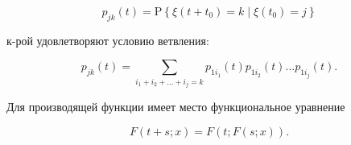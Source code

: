 \documentclass[10pt]{article}
\begin{document}
\[

p_{j k}(t)=\mathrm{P}\left\{\xi\left(t+t_{0}\right)=k \mid \xi\left(t_{0}\right)=j\right\}

\]



к-рой удовлетворяют условию ветвления:



\[

p_{j k}(t)=\sum_{i_{1}+i_{2}+\ldots+i_{j}=k} p_{1 i_{1}}(t) p_{1 i_{2}}(t) \ldots p_{1 i_{j}}(t) .

\]



Для производящей функции имеет место функциональное уравнение



\[

F(t+s ; x)=F(t ; F(s ; x)) .

\]
\end{document}
